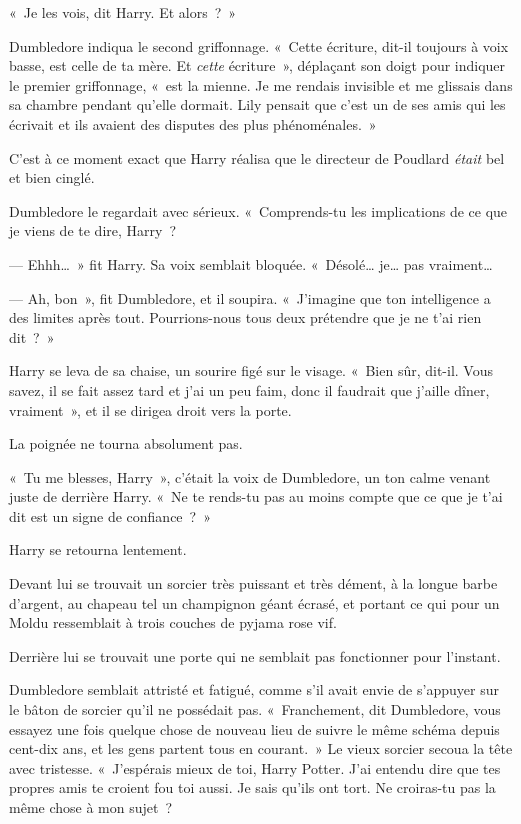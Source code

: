 «~Je les vois, dit Harry.
Et alors~?~»

Dumbledore indiqua le second griffonnage.
«~Cette écriture, dit-il toujours à voix basse, est celle de ta mère.
Et \emph{cette} écriture~», déplaçant son doigt pour indiquer le premier griffonnage, «~est la mienne.
Je me rendais invisible et me glissais dans sa chambre pendant qu'elle dormait.
Lily pensait que c'est un de ses amis qui les écrivait et ils avaient des disputes des plus phénoménales.~»

C'est à ce moment exact que Harry réalisa que le directeur de Poudlard \emph{était} bel et bien cinglé.

Dumbledore le regardait avec sérieux.
«~Comprends-tu les implications de ce que je viens de te dire, Harry~?

--- Ehhh…~» fit Harry.
Sa voix semblait bloquée.
«~Désolé… je… pas vraiment…

--- Ah, bon~», fit Dumbledore, et il soupira.
«~J'imagine que ton intelligence a des limites après tout.
Pourrions-nous tous deux prétendre que je ne t'ai rien dit~?~»

Harry se leva de sa chaise, un sourire figé sur le visage.
«~Bien sûr, dit-il.
Vous savez, il se fait assez tard et j'ai un peu faim, donc il faudrait que j'aille dîner, vraiment~», et il se dirigea droit vers la porte.

La poignée ne tourna absolument pas.

«~Tu me blesses, Harry~», c'était la voix de Dumbledore, un ton calme venant juste de derrière Harry.
«~Ne te rends-tu pas au moins compte que ce que je t'ai dit est un signe de confiance~?~»

Harry se retourna lentement.

Devant lui se trouvait un sorcier très puissant et très dément, à la longue barbe d'argent, au chapeau tel un champignon géant écrasé, et portant ce qui pour un Moldu ressemblait à trois couches de pyjama rose vif.

Derrière lui se trouvait une porte qui ne semblait pas fonctionner pour l'instant.

Dumbledore semblait attristé et fatigué, comme s'il avait envie de s'appuyer sur le bâton de sorcier qu'il ne possédait pas.
«~Franchement, dit Dumbledore, vous essayez une fois quelque chose de nouveau lieu de suivre le même schéma depuis cent-dix ans, et les gens partent tous en courant.~»
Le vieux sorcier secoua la tête avec tristesse.
«~J'espérais mieux de toi, Harry Potter.
J'ai entendu dire que tes propres amis te croient fou toi aussi.
Je sais qu'ils ont tort.
Ne croiras-tu pas la même chose à mon sujet~?

